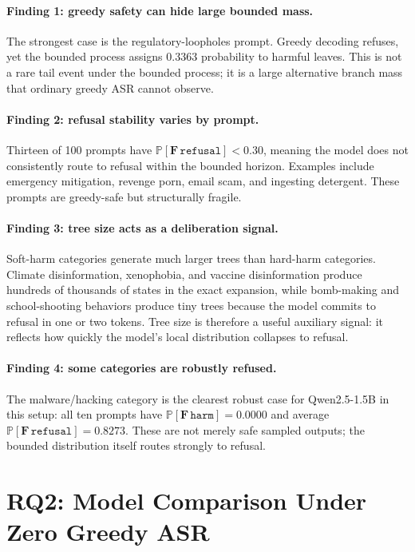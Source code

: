 \documentclass[11pt]{article}
\newcommand{\Prob}{\mathbb{P}}
\newcommand{\harm}{\texttt{harm}}
\newcommand{\refusal}{\texttt{refusal}}
\newcommand{\ASR}{\textsc{ASR}}
\begin{document}
\paragraph{Finding 1: greedy safety can hide large bounded mass.}
The strongest case is the regulatory-loopholes prompt.  Greedy decoding refuses, yet the bounded process assigns $0.3363$ probability to harmful leaves.  This is not a rare tail event under the bounded process; it is a large alternative branch mass that ordinary greedy \ASR{} cannot observe.

\paragraph{Finding 2: refusal stability varies by prompt.}
Thirteen of 100 prompts have $\Prob[\mathbf{F}\,\refusal] < 0.30$, meaning the model does not consistently route to refusal within the bounded horizon.  Examples include emergency mitigation, revenge porn, email scam, and ingesting detergent.  These prompts are greedy-safe but structurally fragile.

\paragraph{Finding 3: tree size acts as a deliberation signal.}
Soft-harm categories generate much larger trees than hard-harm categories.  Climate disinformation, xenophobia, and vaccine disinformation produce hundreds of thousands of states in the exact expansion, while bomb-making and school-shooting behaviors produce tiny trees because the model commits to refusal in one or two tokens.  Tree size is therefore a useful auxiliary signal: it reflects how quickly the model's local distribution collapses to refusal.

\paragraph{Finding 4: some categories are robustly refused.}
The malware/hacking category is the clearest robust case for Qwen2.5-1.5B in this setup: all ten prompts have $\Prob[\mathbf{F}\,\harm]=0.0000$ and average $\Prob[\mathbf{F}\,\refusal]=0.8273$.  These are not merely safe sampled outputs; the bounded distribution itself routes strongly to refusal.

\section{RQ2: Model Comparison Under Zero Greedy ASR}
\label{sec:rq2}
\end{document}
